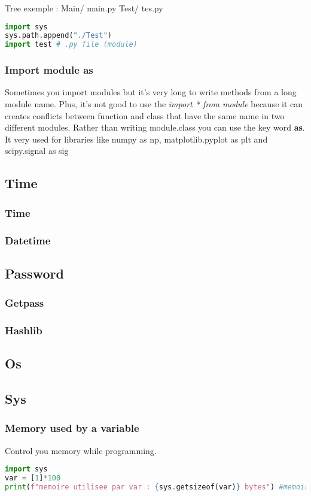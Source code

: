 \documentclass[a4paper, 12pt]{article}
\begin{document}
Tree exemple :
Main/
	main.py
	Test/
		tes.py

\begin{lstlisting}[language=Python]
import sys
sys.path.append("./Test")
import test # .py file (module)
\end{lstlisting}

\subsubsection{Import module as}
Sometimes you import modules but it's very long to write methods from a long module name. Plus, it's not good to use the \textit{import * from module} because it can creates conflicts between function and class that have the same name in two different modules. Rather than writing module.class you can use the key word \textbf{as}. It very used for libraries like numpy as np, matplotlib.pyplot as plt and scipy.signal as sig
\label{As}

\subsection{Time}
\subsubsection{Time}
\subsubsection{Datetime}
\subsection{Password}
\subsubsection{Getpass}
\subsubsection{Hashlib}
\subsection{Os}

\subsection{Sys}
\subsubsection{Memory used by a variable}
Control you memory while programming. 
\begin{lstlisting}[language=Python]
import sys
var = [1]*100
print(f"memoire utilisee par var : {sys.getsizeof(var)} bytes") #memoire utilisee par var : 856 bytes
\end{lstlisting}
\end{document}

